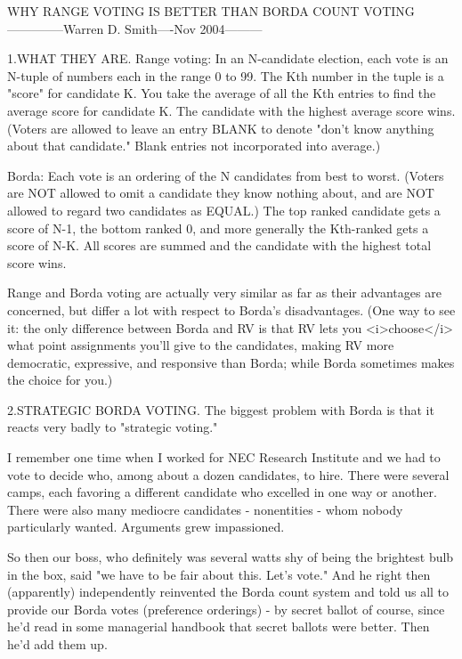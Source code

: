 WHY RANGE VOTING IS BETTER THAN BORDA COUNT VOTING
--------------Warren D. Smith----Nov 2004---------


1.WHAT THEY ARE.
Range voting: In an N-candidate election, each vote
is an N-tuple of numbers each in the range 0 to 99.
The Kth number in the tuple is a "score" for candidate K.
You take the average of all the Kth entries to find
the average score for candidate K.  The candidate
with the highest average score wins.
(Voters are allowed to leave an entry BLANK to denote
"don't know anything about that candidate."  Blank entries
not incorporated into average.)

Borda: Each vote is an ordering of the N candidates
from best to worst.  (Voters are NOT allowed to omit a
candidate they know nothing about, and are NOT allowed
to regard two candidates as EQUAL.)
The top ranked candidate gets a score of N-1, the bottom ranked 0,
and more generally the Kth-ranked gets a score of N-K.
All scores are summed and the candidate with the highest
total score wins.

Range and Borda voting are actually very similar as far as their advantages are concerned,
but differ a lot with respect to Borda's disadvantages.
(One way to see it: the only difference between 
Borda and RV is that RV lets you <i>choose</i> what point assignments you'll give 
to the candidates, making RV more democratic, expressive,  and responsive 
than Borda; while Borda sometimes makes the choice for you.)


2.STRATEGIC BORDA VOTING.
The biggest problem with Borda is that it reacts very badly to "strategic voting."

I remember one time when I worked for NEC Research Institute and we had to vote to decide
who, among about a dozen candidates, to hire.  There were several camps, each favoring a 
different candidate who excelled in one way or another.  There were also many mediocre 
candidates - nonentities - whom nobody particularly wanted.  Arguments grew impassioned.

So then our boss, who definitely was several watts shy of being the brightest 
bulb in the box, said "we have to be fair about this. Let's vote."  
And he right then (apparently) independently reinvented the Borda count
system and told us all to provide our Borda votes (preference orderings) - by
secret ballot of course, since he'd read in some managerial
handbook that secret ballots were better.  Then he'd add them up.


